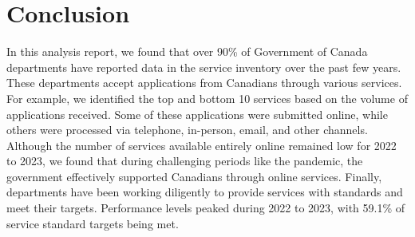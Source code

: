 \section{Conclusion}

In this analysis report, we found that over 90\% of Government of Canada 
departments have reported data in the service inventory over the past few years. 
These departments accept applications from Canadians through various services. 
For example, we identified the top and bottom 10 services based on the volume of 
applications received. Some of these applications were submitted online, while 
others were processed via telephone, in-person, email, and other channels. 
Although the number of services available entirely online remained low for 2022 
to 2023, we found that during challenging periods like the pandemic, the 
government effectively supported Canadians through online services. Finally, 
departments have been working diligently to provide services with standards and 
meet their targets. Performance levels peaked during 2022 to 2023, with 59.1\% 
of service standard targets being met.